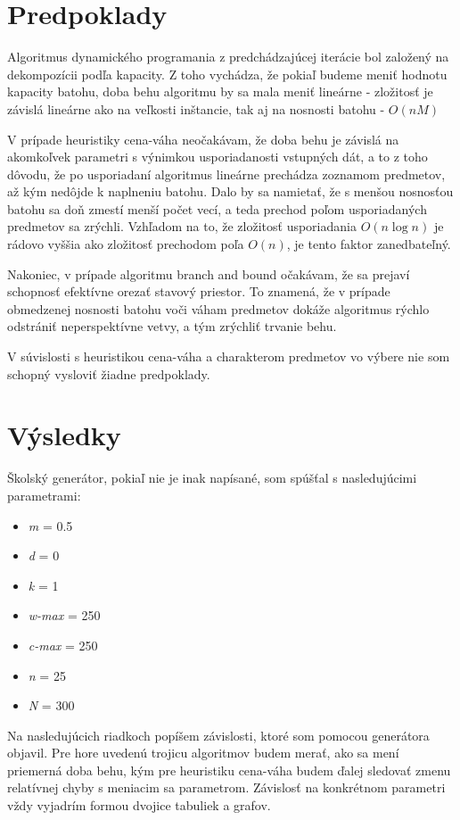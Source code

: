 \documentclass[slovak]{article}
\begin{document}
\section{Predpoklady}

Algoritmus dynamického programania z predchádzajúcej iterácie bol založený na dekompozícii podľa kapacity. Z toho vychádza, že pokiaľ budeme meniť hodnotu kapacity batohu, doba behu algoritmu by sa mala meniť lineárne - zložitosť je závislá lineárne ako na veľkosti inštancie, tak aj na nosnosti batohu - $O(nM)$

V prípade heuristiky cena-váha neočakávam, že doba behu je závislá na akomkoľvek parametri s výnimkou usporiadanosti vstupných dát, a to z toho dôvodu, že po usporiadaní algoritmus lineárne prechádza zoznamom predmetov, až kým nedôjde k naplneniu batohu. Dalo by sa namietať, že s menšou nosnosťou batohu sa doň zmestí menší počet vecí, a teda prechod poľom usporiadaných predmetov sa zrýchli. Vzhľadom na to, že zložitosť usporiadania $O(n\log{}n)$ je rádovo vyššia ako zložitosť prechodom poľa $O(n)$, je tento faktor zanedbateľný.

Nakoniec, v prípade algoritmu branch and bound očakávam, že sa prejaví schopnosť efektívne orezať stavový priestor. To znamená, že v prípade obmedzenej nosnosti batohu voči váham predmetov dokáže algoritmus rýchlo odstrániť neperspektívne vetvy, a tým zrýchliť trvanie behu. 

V súvislosti s heuristikou cena-váha a charakterom predmetov vo výbere nie som schopný vysloviť žiadne predpoklady.

\section{Výsledky}

Školský generátor, pokiaľ nie je inak napísané, som spúšťal s nasledujúcimi parametrami:

\begin{itemize}
\item \emph{m} = 0.5
\item \emph{d} = 0
\item \emph{k} = 1
\item \emph{w-max} = 250
\item \emph{c-max} = 250
\item \emph{n} = 25
\item \emph{N} = 300
\end{itemize}

Na nasledujúcich riadkoch popíšem závislosti, ktoré som pomocou generátora objavil. Pre hore uvedenú trojicu algoritmov budem merať, ako sa mení priemerná doba behu, kým pre heuristiku cena-váha budem ďalej sledovať zmenu relatívnej chyby s meniacim sa parametrom. Závislosť na konkrétnom parametri vždy vyjadrím formou dvojice tabuliek a grafov.
\end{document}
